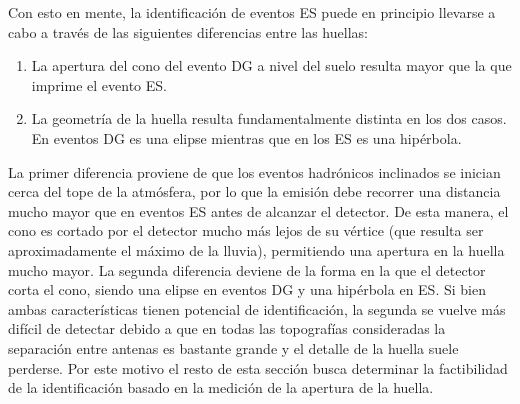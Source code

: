 	Con esto en mente, la identificaci\'on de eventos ES puede en principio llevarse a cabo a trav\'es de las siguientes diferencias entre las huellas:
	\begin{enumerate}
	 \item La apertura del cono del evento DG a nivel del suelo resulta mayor que la que imprime el evento ES.
	 \item La geometr\'ia de la huella resulta fundamentalmente distinta en los dos casos. En eventos DG es una elipse mientras que en los ES es una hip\'erbola.
	\end{enumerate}

	La primer diferencia proviene de que los eventos hadr\'onicos inclinados se inician cerca del tope de la atm\'osfera, por lo que la emisi\'on debe recorrer una distancia mucho mayor que en eventos ES antes de alcanzar el detector.
	De esta manera, el cono \cher{} es cortado por el detector mucho m\'as lejos de su v\'ertice (que resulta ser aproximadamente el m\'aximo de la lluvia), permitiendo una apertura en la huella mucho mayor.
	La segunda diferencia deviene de la forma en la que el detector corta el cono, siendo una elipse en eventos DG y una hip\'erbola en ES.
	Si bien ambas caracter\'isticas tienen potencial de identificaci\'on, la segunda se vuelve m\'as dif\'icil de detectar debido a que en todas las topograf\'ias consideradas la separaci\'on entre antenas es bastante grande y el detalle de la huella suele perderse.
	Por este motivo el resto de esta secci\'on busca determinar la factibilidad de la identificaci\'on basado en la medici\'on de la apertura de la huella.
	
